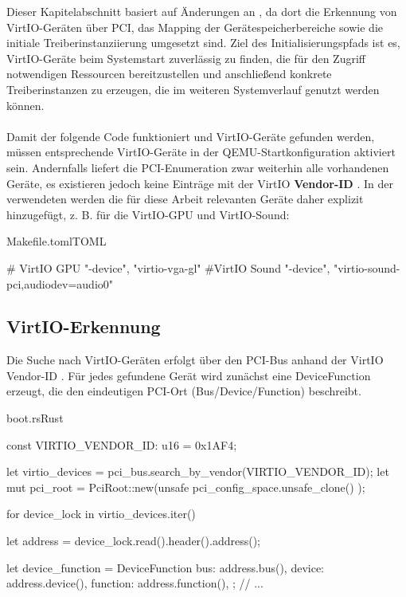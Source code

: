Dieser Kapitelabschnitt basiert auf Änderungen an , da dort die Erkennung von VirtIO-Geräten über PCI, das Mapping der Gerätespeicherbereiche sowie die initiale Treiberinstanziierung umgesetzt sind. Ziel des Initialisierungspfads ist es, VirtIO-Geräte beim Systemstart zuverlässig zu finden, die für den Zugriff notwendigen Ressourcen bereitzustellen und anschließend konkrete Treiberinstanzen zu erzeugen, die im weiteren Systemverlauf genutzt werden können.\\
\\
Damit der folgende Code funktioniert und VirtIO-Geräte gefunden werden, müssen entsprechende VirtIO-Geräte in der QEMU-Startkonfiguration aktiviert sein. Andernfalls liefert die PCI-Enumeration zwar weiterhin alle vorhandenen Geräte, es existieren jedoch keine Einträge mit der VirtIO \textbf{Vendor-ID} . In der verwendeten  werden die für diese Arbeit relevanten Geräte daher explizit hinzugefügt, z. B. für die VirtIO-GPU und VirtIO-Sound:

\begin{codeblock}{Makefile.toml}{TOML}
  \begin{rustcode}
# VirtIO GPU
"-device", "virtio-vga-gl"
#VirtIO Sound
"-device", "virtio-sound-pci,audiodev=audio0"
  \end{rustcode}
\end{codeblock}


\subsection{VirtIO-Erkennung}

Die Suche nach VirtIO-Geräten erfolgt über den PCI-Bus anhand der VirtIO Vendor-ID . Für jedes gefundene Gerät wird zunächst eine DeviceFunction erzeugt, die den eindeutigen PCI-Ort (Bus/Device/Function) beschreibt.

\begin{codeblock}{boot.rs}{Rust}
  \begin{rustcode}
const VIRTIO_VENDOR_ID: u16 = 0x1AF4;

let virtio_devices = pci_bus.search_by_vendor(VIRTIO_VENDOR_ID);
let mut pci_root = PciRoot::new(unsafe { pci_config_space.unsafe_clone() });

for device_lock in virtio_devices.iter() {
    let address = device_lock.read().header().address();

    let device_function = DeviceFunction {
        bus: address.bus(),
        device: address.device(),
        function: address.function(),
    };
    // ...
}
  \end{rustcode}
\end{codeblock}

